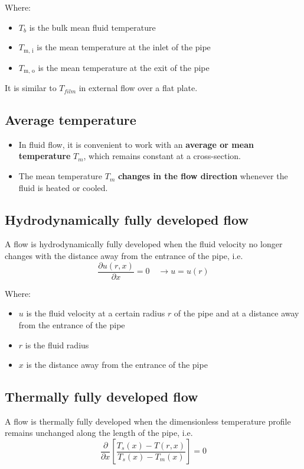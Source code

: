 \documentclass[11pt]{article}
\begin{document}
Where:
\begin{itemize}
\item \(T_b\) is the bulk mean fluid temperature
\item \(T_{\text{m, i}}\) is the mean temperature at the inlet of the pipe
\item \(T_{\text{m, o}}\) is the mean temperature at the exit of the pipe
\end{itemize}

It is similar to \(T_{film}\) in external flow over a flat plate.

\subsection{Average temperature}
\label{sec:org395613f}
\begin{itemize}
\item In fluid flow, it is convenient to work with an \textbf{average or mean temperature} \(T_m\), which remains constant at a cross-section.
\item The mean temperature \(T_m\) \textbf{changes in the flow direction} whenever the fluid is heated or cooled.
\end{itemize}

\subsection{Hydrodynamically fully developed flow}
\label{sec:org8a28aff}
A flow is hydrodynamically fully developed when the fluid velocity no longer changes with the distance away from the entrance of the pipe, i.e.
\[\frac{\partial u(r, x)}{\partial x} = 0 \quad \rightarrow u = u(r)\]

Where:
\begin{itemize}
\item \(u\) is the fluid velocity at a certain radius \(r\) of the pipe and at a distance away from the entrance of the pipe
\item \(r\) is the fluid radius
\item \(x\) is the distance away from the entrance of the pipe
\end{itemize}

\subsection{Thermally fully developed flow}
\label{sec:org5f2a51a}
A flow is thermally fully developed when the dimensionless temperature profile remains unchanged along the length of the pipe, i.e.
\[\frac{\partial}{\partial x} \left[\frac{T_s (x) - T(r, x)}{T_s (x) - T_m (x)} \right] = 0\]
\end{document}
